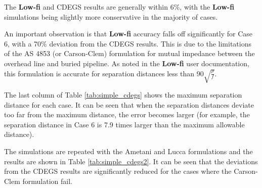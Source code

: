 \documentclass{article}
\begin{document}
The \textbf{Low-fi} and CDEGS results are generally within 6\%, with the \textbf{Low-fi} simulations being slightly more conservative in the majority of cases. 

An important observation is that \textbf{Low-fi} accuracy falls off significantly for Case 6, with a 70\% deviation from the CDEGS results. This is due to the limitations of the AS 4853 (or Carson-Clem) formulation for mutual impedance between the overhead line and buried pipeline. As noted in the \textbf{Low-fi} user documentation, this formulation is accurate for separation distances less than $90 \sqrt{\frac{\rho}{f}}$.

The last column of Table \ref{tab:simple_cdegs} shows the maximum separation distance for each case. It can be seen that when the separation distances deviate too far from the maximum distance, the error becomes larger (for example, the separation distance in Case 6 is 7.9 times larger than the maximum allowable distance).

The simulations are repeated with the Ametani and Lucca formulations and the results are shown in Table \ref{tab:simple_cdegs2}. It can be seen that the deviations from the CDEGS results are significantly reduced for the cases where the Carson-Clem formulation fail.
\end{document}
